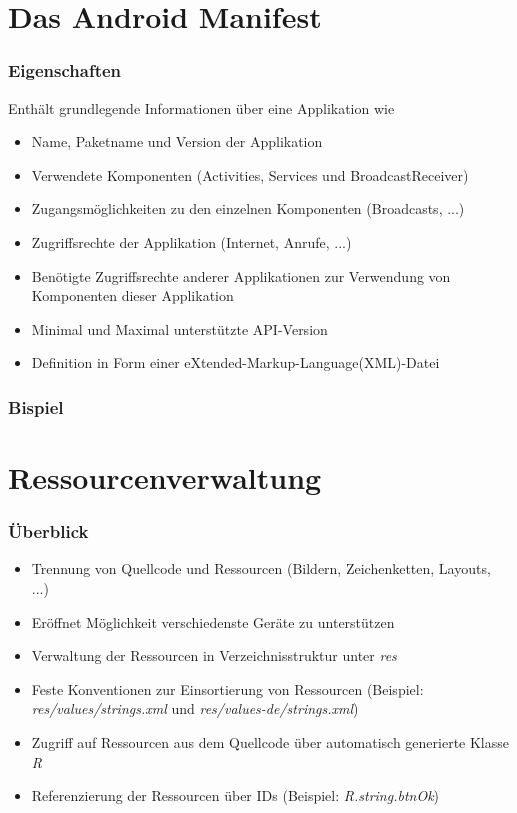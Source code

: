 \section{Das Android Manifest}
\begin{frame}[label=manifest]
   \frametitle{Eigenschaften}
   Enthält grundlegende Informationen über eine Applikation wie
   \begin{itemize}
      \item Name, Paketname und Version der Applikation
      \item Verwendete Komponenten (Activities, Services und BroadcastReceiver)
      \item Zugangsmöglichkeiten zu den einzelnen Komponenten (Broadcasts, ...)
      \item Zugriffsrechte der Applikation (Internet, Anrufe, ...)
      \item Benötigte Zugriffsrechte anderer Applikationen zur Verwendung 
         von Komponenten dieser Applikation
      \item Minimal und Maximal unterstützte API-Version
      \item Definition in Form einer eXtended-Markup-Language(XML)-Datei
   \end{itemize}
\end{frame}

\begin{frame}[fragile, label=manifest_structure]
   \frametitle{Bispiel}
   
\end{frame}

\section{Ressourcenverwaltung}
\begin{frame}
   \frametitle{Überblick}
   \begin{itemize}
      \item Trennung von Quellcode und Ressourcen (Bildern, Zeichenketten, Layouts, ...)
      \item Eröffnet Möglichkeit verschiedenste Geräte zu unterstützen
      \item Verwaltung der Ressourcen in Verzeichnisstruktur unter \emph{res}
      \item Feste Konventionen zur Einsortierung von Ressourcen 
         (Beispiel: \emph{res/values/strings.xml} und \emph{res/values-de/strings.xml})
      \item Zugriff auf Ressourcen aus dem Quellcode über automatisch generierte Klasse \emph{R}
      \item Referenzierung der Ressourcen über IDs (Beispiel: \emph{R.string.btnOk})
   \end{itemize}

   
\end{frame}

